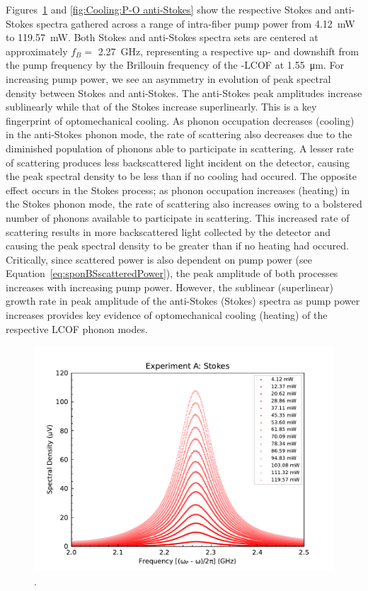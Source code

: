 Figures~\ref{fig:Cooling:P-O Stokes} and \ref{fig:Cooling:P-O anti-Stokes} show the respective Stokes and anti-Stokes spectra gathered across a range of intra-fiber pump power from \SI{4.12}{\milli\watt} to \SI{119.57}{\milli\watt}. Both Stokes and anti-Stokes spectra sets are centered at approximately \(f_{B} = \) \SI{2.27}{\giga\hertz}, representing a respective up- and downshift from the pump frequency by the Brillouin frequency of the -\ac{LCOF} at \SI{1.55}{\micro\meter}. For increasing pump power, we see an asymmetry in evolution of peak spectral density between Stokes and anti-Stokes. The anti-Stokes peak amplitudes increase sublinearly while that of the Stokes increase superlinearly. This is a key fingerprint of optomechanical cooling. As phonon occupation decreases (cooling) in the anti-Stokes phonon mode, the rate of scattering also decreases due to the diminished population of phonons able to participate in scattering. A lesser rate of scattering produces less backscattered light incident on the detector, causing the peak spectral density to be less than if no cooling had occured. The opposite effect occurs in the Stokes process; as phonon occupation increases (heating) in the Stokes phonon mode, the rate of scattering also increases owing to a bolstered number of phonons available to participate in scattering. This increased rate of scattering results in more backscattered light collected by the detector and causing the peak spectral density to be greater than if no heating had occured. Critically, since scattered power is also dependent on pump power (see Equation~\ref{eq:sponBSscatteredPower}), the peak amplitude of both processes increases with increasing pump power. However, the sublinear (superlinear) growth rate in peak amplitude of the anti-Stokes (Stokes) spectra as pump power increases provides key evidence of optomechanical cooling (heating) of the respective \ac{LCOF} phonon modes.

\begin{figure}[t]
  \centering
  \includegraphics[width=\textwidth]{figs/3-Cooling/P-O Stokes.pdf}
  \caption{.}
  \label{fig:Cooling:P-O Stokes}
\end{figure}

